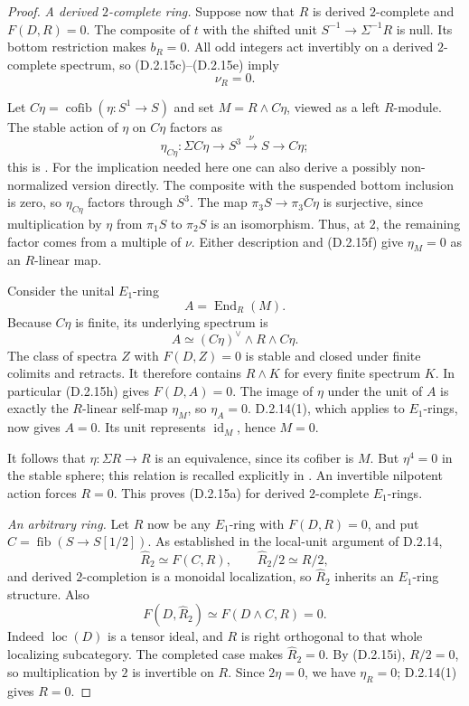 \begin{proof}
\emph{A derived $2$-complete ring.}
Suppose now that $R$ is derived $2$-complete and $F(D,R)=0$.
The composite of $t$ with the shifted unit
$S^{-1}\to\Sigma^{-1}R$ is null. Its bottom restriction makes
$b_R=0$. All odd integers act invertibly on a derived $2$-complete
spectrum, so \textup{(D.2.15c)--(D.2.15e)} imply
\[
 \nu_R=0.
 \tag{D.2.15f}
\]

Let $C\eta=\operatorname{cofib}(\eta:S^1\to S)$ and set
$M=R\wedge C\eta$, viewed as a left $R$-module. The stable action
of $\eta$ on $C\eta$ factors as
\[
 \eta_{C\eta}:\Sigma C\eta\longrightarrow S^3
       \xrightarrow{\nu}S\longrightarrow C\eta;
 \tag{D.2.15g}
\]
this is \cite[equation (8.4), p.~1279]{EH5AngeltveitRognes2005}.
For the implication needed here one can also derive a possibly
non-normalized version directly. The composite with the suspended
bottom inclusion is zero, so $\eta_{C\eta}$ factors through $S^3$.
The map $\pi_3S\to\pi_3C\eta$ is surjective, since multiplication
by $\eta$ from $\pi_1S$ to $\pi_2S$ is an isomorphism. Thus, at
$2$, the remaining factor comes from a multiple of $\nu$.
Either description and \textup{(D.2.15f)} give
$\eta_M=0$ as an $R$-linear map.

Consider the unital $E_1$-ring
\[
 A=\operatorname{End}_R(M).
\]
Because $C\eta$ is finite, its underlying spectrum is
\[
 A\simeq(C\eta)^\vee\wedge R\wedge C\eta.
 \tag{D.2.15h}
\]
The class of spectra $Z$ with $F(D,Z)=0$ is stable and closed
under finite colimits and retracts. It therefore contains
$R\wedge K$ for every finite spectrum $K$. In particular
\textup{(D.2.15h)} gives $F(D,A)=0$.
The image of $\eta$ under the unit of $A$ is exactly the
$R$-linear self-map $\eta_M$, so $\eta_A=0$.
D.2.14(1), which applies to $E_1$-rings, now gives $A=0$.
Its unit represents $\operatorname{id}_M$, hence $M=0$.

It follows that $\eta:\Sigma R\to R$ is an equivalence, since its
cofiber is $M$. But $\eta^4=0$ in the stable sphere; this relation
is recalled explicitly in
\cite[proof of Lemma 8.11, p.~1285]{EH5AngeltveitRognes2005}.
An invertible nilpotent action forces $R=0$. This proves
\textup{(D.2.15a)} for derived $2$-complete $E_1$-rings.

\emph{An arbitrary ring.}
Let $R$ now be any $E_1$-ring with $F(D,R)=0$, and put
$C=\operatorname{fib}(S\to S[1/2])$.
As established in the local-unit argument of D.2.14,
\[
 \widehat R_2\simeq F(C,R),\qquad
 \widehat R_2/2\simeq R/2,
 \tag{D.2.15i}
\]
and derived $2$-completion is a monoidal localization, so
$\widehat R_2$ inherits an $E_1$-ring structure. Also
\[
 F(D,\widehat R_2)\simeq F(D\wedge C,R)=0.
\]
Indeed $\operatorname{loc}(D)$ is a tensor ideal, and $R$ is right
orthogonal to that whole localizing subcategory. The completed
case makes $\widehat R_2=0$. By \textup{(D.2.15i)}, $R/2=0$,
so multiplication by $2$ is invertible on $R$. Since $2\eta=0$,
we have $\eta_R=0$; D.2.14(1) gives $R=0$.


\end{proof}

